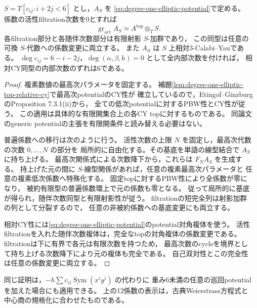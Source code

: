\begin{lemma}\label{lem:degree-one-elliptic-universal-lower-pbw}
$S=T[c_{ij}:i+2j<6]$ とし，$A_S$ を
\eqref{eq:degree-one-elliptic-potential}で定める。
係数の活性filtration次数を0とすれば
\[
 \operatorname{gr}_{\mathrm{act}}A_S
       \simeq A^{\mathrm{top}}\otimes_T S.
\]
各filtration部分と各随伴次数部分は有限射影 $S$-加群であり，
この同型は任意の可換 $S$-代数への係数変更に両立する。
また $A_S$ は $S$ 上相対3-Calabi--Yauである。
$\deg c_{ij}=6-i-2j$，$\deg(\alpha,\beta,h)=0$ として全内部次数を付ければ，
相対CY同型の内部次数のずれは6である。
\end{lemma}
\begin{proof}
複素数値の最高次パラメータを固定する。
補題\ref{lem:degree-one-elliptic-top-relative-cy}で最高次potentialのCY性が
確立しているので，Etingof--GinzburgのProposition 7.3.1(ii)から，
全ての低次potentialに対するPBW性とCY性が従う\cite{EG2010}。
この適用は具体的な有限開集合上の各CY topに対するものである。
同論文のgeneric potentialの主張を有限開条件と読み替える必要はない。

普遍係数への移行は次のように行う。
活性次数の上限 $N$ を固定し，最高次代数の次数 $0,\ldots,N$ の部分を
局所的に自由化する。その基底を単語の線型結合で $A_S$ に持ち上げる。
最高次関係式による次数降下から，これらは $F_NA_S$ を生成する。
持上げた元の間に $S$-線型関係があれば，任意の複素最高次パラメータと
任意の複素低次係数へ特殊化する。
固定topに対するPBW性により全係数が零になり，
被約有限型の普遍係数環上で元の係数も零となる。
従って局所的に基底が得られ，随伴次数同型と有限射影性が従う。
filtrationの短完全列は射影加群の列として分裂するので，
任意の非被約係数への基底変更にも両立する。

相対CY性には\eqref{eq:degree-one-elliptic-potential}のpotential対角複体を使う。
活性filtrationを入れた随伴次数複体は，完全なtopの対角複体の係数変更である。
filtrationは下に有界で各元は有限次数を持つため，
最高次数のcycleを境界として持ち上げる次数降下により元の複体も完全である。
自己双対性とこの完全性は任意の係数変更に両立する。
\end{proof}

\begin{remark}\label{rem:degree-one-general-cyclic-lower}
同じ証明は，$-h\sum c_{ij}\operatorname{Sym}(x^iy^j)$ の代わりに
重み6未満の任意の巡回potentialを加えた場合にも適用できる。
上の12係数の表示は，古典Weierstrass方程式と中心商の規格化に合わせたものである。
\end{remark}
